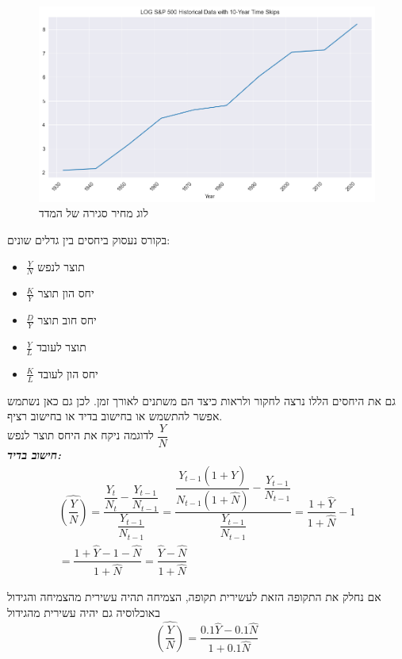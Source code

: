 \documentclass[a4paper,12pt]{article}
\begin{document}
\begin{RTL}
\begin{hebrew}
\begin{figure}[H]
    \centering
    \includegraphics[width=1\linewidth]{LOG S&P500.png}
    \caption{לוג מחיר סגירה של המדד}
\end{figure}
בקורס נעסוק ביחסים בין גדלים שונים:
\begin{itemize}
    \item $\frac{Y}{N}$ תוצר לנפש
    \item $\frac{K}{Y}$ יחס הון תוצר
    \item $\frac{D}{Y}$ יחס חוב תוצר
    \item $\frac{Y}{L}$ תוצר לעובד
    \item $\frac{K}{L}$ יחס הון לעובד
\end{itemize}
גם את היחסים הללו נרצה לחקור ולראות כיצד הם משתנים לאורך זמן. לכן גם כאן נשתמש אפשר להתשמש או בחישוב בדיד או בחישוב רציף.
\\
לדוגמה ניקח את היחס תוצר לנפש $\dfrac{Y}{N}$ \\
\textbf{\textit{חישוב בדיד:}}
\begin{multline*}
\widehat{\left(\dfrac{{Y}}{N}\right)} =\dfrac{\dfrac{Y_t}{N_t}-\dfrac{Y_{t-1}}{N_{t-1}}}{\dfrac{Y_{t-1}}{N_{t-1}}}=\dfrac{\dfrac{Y_{t-1}(1+\widehat{Y})}{N_{t-1}(1+\widehat{N})}-\dfrac{Y_{t-1}}{N_{t-1}}}{\dfrac{Y_{t-1}}{N_{t-1}}}=\dfrac{1+\widehat{Y}}{1+\widehat{N}}-1 \\
= \dfrac{1+\widehat{Y}-1-\widehat{N}}{1+\widehat{N}}=\dfrac{\widehat{Y}-\widehat{N}}{1+\widehat{N}}
\end{multline*}

אם נחלק את התקופה הזאת לעשירית תקופה, הצמיחה תהיה עשירית מהצמיחה והגידול באוכלוסיה גם יהיה עשירית מהגידול
\begin{equation*}
    \widehat{\left(\frac{Y}{N}\right)}
    = \dfrac{0.1\widehat Y - 0.1 \widehat N} {1 + 0.1\widehat N}
\end{equation*}


\end{hebrew}
\end{RTL}
\end{document}
